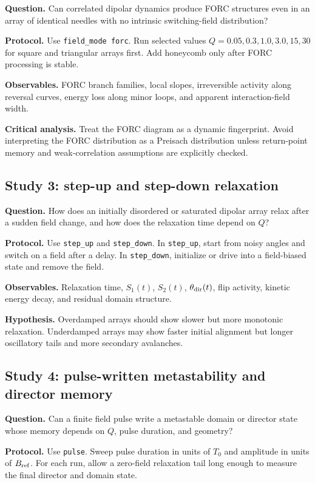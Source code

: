 \documentclass[11pt,a4paper]{article}
\newcommand{\code}[1]{\texttt{#1}}
\begin{document}
\textbf{Question.} Can correlated dipolar dynamics produce FORC structures even in an array of identical needles with no intrinsic switching-field distribution?

\textbf{Protocol.} Use \code{field\_mode forc}. Run selected values $Q=0.05,0.3,1.0,3.0,15,30$ for square and triangular arrays first. Add honeycomb only after FORC processing is stable.

\textbf{Observables.} FORC branch families, local slopes, irreversible activity along reversal curves, energy loss along minor loops, and apparent interaction-field width.

\textbf{Critical analysis.} Treat the FORC diagram as a dynamic fingerprint. Avoid interpreting the FORC distribution as a Preisach distribution unless return-point memory and weak-correlation assumptions are explicitly checked.

\subsection{Study 3: step-up and step-down relaxation}

\textbf{Question.} How does an initially disordered or saturated dipolar array relax after a sudden field change, and how does the relaxation time depend on $Q$?

\textbf{Protocol.} Use \code{step\_up} and \code{step\_down}. In \code{step\_up}, start from noisy angles and switch on a field after a delay. In \code{step\_down}, initialize or drive into a field-biased state and remove the field.

\textbf{Observables.} Relaxation time, $S_1(t)$, $S_2(t)$, $\theta_{\rm dir}(t)$, flip activity, kinetic energy decay, and residual domain structure.

\textbf{Hypothesis.} Overdamped arrays should show slower but more monotonic relaxation. Underdamped arrays may show faster initial alignment but longer oscillatory tails and more secondary avalanches.

\subsection{Study 4: pulse-written metastability and director memory}

\textbf{Question.} Can a finite field pulse write a metastable domain or director state whose memory depends on $Q$, pulse duration, and geometry?

\textbf{Protocol.} Use \code{pulse}. Sweep pulse duration in units of $T_0$ and amplitude in units of $B_{\rm ref}$. For each run, allow a zero-field relaxation tail long enough to measure the final director and domain state.
\end{document}
